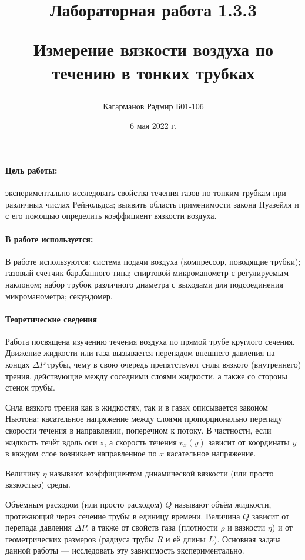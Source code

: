 \documentclass[a4paper,12pt]{article}
\title{Лабораторная работа 1.3.3 

Измерение вязкости воздуха по течению в тонких трубках}
\author{Кагарманов Радмир Б01-106}
\date{6 мая 2022 г.}
\begin{document}
\maketitle
\thispagestyle{empty}
\newpage
\setcounter{page}{1}
\paragraph{Цель работы:}экспериментально исследовать свойства течения газов по тонким трубкам при различных числах Рейнольдса; выявить область применимости закона Пуазейля и с его помощью определить коэффициент вязкости воздуха.
\paragraph{В работе используется:}В работе используются: система подачи воздуха (компрессор, поводящие трубки); газовый счетчик барабанного типа; спиртовой микроманометр с регулируемым наклоном; набор трубок различного диаметра с выходами для подсоединения микроманометра; секундомер.
\paragraph{Теоретические сведения\\}
Работа посвящена изучению течения воздуха по прямой трубе круглого сечения. Движение жидкости или газа вызывается перепадом внешнего давления на концах $\Delta P$ трубы, чему в свою очередь препятствуют силы вязкого (внутреннего) трения, действующие между соседними слоями жидкости, а также со стороны стенок трубы.

Сила вязкого трения как в жидкостях, так и в газах описывается законом
Ньютона: касательное напряжение между слоями пропорционально перепаду
скорости течения в направлении, поперечном к потоку. В частности, если жидкость течёт вдоль оси x,  а скорость течения $v_{x}(y)$ зависит от координаты $y$  в каждом слое возникает направленное по $x$ касательное напряжение.

Величину $\eta$ называют коэффициентом динамической вязкости (или просто вязкостью) среды.

Объёмным расходом (или просто расходом) $Q$ называют объём жидкости,
протекающий через сечение трубы в единицу времени. Величина $Q$ зависит от
перепада давления $\Delta P$, а также от свойств газа (плотности $\rho$ и вязкости $\eta$) и от
геометрических размеров (радиуса трубы $R$ и её длины $L$). Основная задача
данной работы — исследовать эту зависимость экспериментально.
\end{document}
